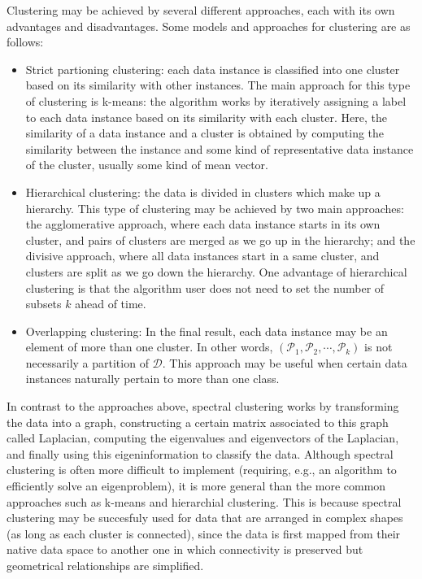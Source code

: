 Clustering may be achieved by several different approaches, each with its own advantages and disadvantages.
Some models and approaches for clustering are as follows:
\begin{itemize}
   \item Strict partioning clustering: each data instance is classified into one cluster based on its similarity with other instances.
      The main approach for this type of clustering is k-means: the algorithm works by iteratively assigning a label to each data instance based on its similarity with each cluster.
      Here, the similarity of a data instance and a cluster is obtained by computing the similarity between the instance and some kind of representative data instance of the cluster, usually some kind of mean vector.
   \item Hierarchical clustering: the data is divided in clusters which make up a hierarchy.
      This type of clustering may be achieved by two main approaches: the agglomerative approach, where each data instance starts in its own cluster, and pairs of clusters are merged as we go up in the hierarchy; and the divisive approach, where all data instances start in a same cluster, and clusters are split as we go down the hierarchy.
      One advantage of hierarchical clustering is that the algorithm user does not need to set the number of subsets $k$ ahead of time.
   \item Overlapping clustering: In the final result, each data instance may be an element of more than one cluster.
      In other words, $(\mathcal P_1, \mathcal P_2, \cdots, \mathcal P_k)$ is not necessarily a partition of $\mathcal D$.
      This approach may be useful when certain data instances naturally pertain to more than one class.
\end{itemize}

In contrast to the approaches above, spectral clustering works by transforming the data into a graph, constructing a certain matrix associated to this graph called Laplacian, computing the eigenvalues and eigenvectors of the Laplacian, and finally using this eigeninformation to classify the data.
Although spectral clustering is often more difficult to implement (requiring, e.g., an algorithm to efficiently solve an eigenproblem), it is more general than the more common approaches such as k-means and hierarchial clustering.
This is because spectral clustering may be succesfuly used for data that are arranged in complex shapes (as long as each cluster is connected), since the data is first mapped from their native data space to another one in which connectivity is preserved but geometrical relationships are simplified.

